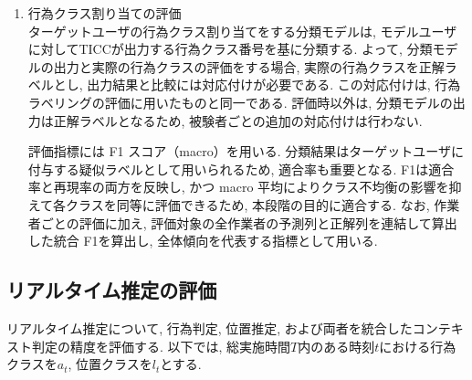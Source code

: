 \documentclass[a4paper,12pt]{jreport}
\begin{document}
\begin{enumerate}[label=(\arabic*)]
本指標はクラスごとの正解率を示す.

多数クラス正解率は$N_c$が最大となるクラスの$\mathrm{Acc}_c$, 少数クラス正解率は$N_c$が最小となるクラスの$\mathrm{Acc}_c$とする. Balanced Accuracy $\mathrm{BA}$はクラス別正解率の平均として定義する.

\begin{equation}
\mathrm{BA}=\frac{\mathrm{Acc}_{c_0}+\mathrm{Acc}_{c_1}}{2}.
\end{equation}

これはクラス不均衡の影響を受けやすい全体正解率に対し, 両クラスを同等に評価する再現率を重視した指標である. Balanced Accuracy は2値分類における感度（TPR）と特異度（TNR）の算術平均としても定義され, クラス不均衡下で両クラスを同等に扱う評価指標として用いられる[32].

本研究では, クラスタリング結果の比較（パラメータ選定）において$\mathrm{BA}$を主指標とする. これは, 行為ラベルにクラス不均衡が生じる場合, 全体正解率$\mathrm{Acc}$は多数クラスに引きずられ, 多数クラスのみを当てる解でも高く評価されうるためである. $\mathrm{BA}$は少数クラスの取りこぼしを明確に評価に反映できる. また, 多数／少数クラス正解率を併記することで, 誤りがどのクラスに偏るかを診断できる.

  \item 行為クラス割り当ての評価\\
  ターゲットユーザの行為クラス割り当てをする分類モデルは, モデルユーザに対してTICCが出力する行為クラス番号を基に分類する. よって,  分類モデルの出力と実際の行為クラスの評価をする場合, 実際の行為クラスを正解ラベルとし,  出力結果と比較には対応付けが必要である.  この対応付けは,  行為ラベリングの評価に用いたものと同一である. 評価時以外は,  分類モデルの出力は正解ラベルとなるため,  被験者ごとの追加の対応付けは行わない. 
  
評価指標には F1 スコア（macro）を用いる. 分類結果はターゲットユーザに付与する疑似ラベルとして用いられるため, 適合率も重要となる. F1は適合率と再現率の両方を反映し, かつ macro 平均によりクラス不均衡の影響を抑えて各クラスを同等に評価できるため, 本段階の目的に適合する. なお, 作業者ごとの評価に加え, 評価対象の全作業者の予測列と正解列を連結して算出した統合 F1を算出し, 全体傾向を代表する指標として用いる. 

  
\end{enumerate}

\subsection{リアルタイム推定の評価}
リアルタイム推定について, 行為判定, 位置推定, および両者を統合したコンテキスト判定の精度を評価する. 以下では, 総実施時間$T$内のある時刻$t$における行為クラスを$a_t$, 位置クラスを$l_t$とする.
\end{document}

